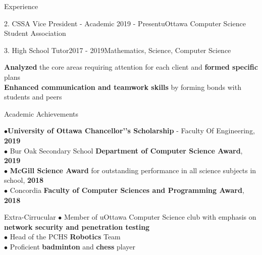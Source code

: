 \documentclass{resume} %
\begin{document}
{\begin{rSection}{Experience}
\begin{rSubsection}{2. CSSA Vice President - Academic }{2019 - Present}{uOttawa Computer Science Student Association}{}
\end{rSubsection}

\begin{rSubsection}{3. High School Tutor}{2017 - 2019}{Mathematics, Science, Computer Science}{}

\begin{list}{\leftmargin=2em}
\item \textbf{Analyzed} the core areas requiring attention for each client and \textbf{formed specific} plans \\
\textbf{Enhanced communication and teamwork skills} by forming bonds with students
and peers 
\end{list}

\end{rSubsection}

\end{rSection}



\begin{rSection}{Academic Achievements} 

\begin{list}{}{\leftmargin=0em} \itemsep -2pt

$\bullet${\bf University of Ottawa Chancellor'’s Scholarship} - Faculty Of Engineering, {\bf 2019} \\
$\bullet$ Bur Oak Secondary School {\bf Department of Computer Science Award}, {\bf 2019}\\
$\bullet$ {\bf McGill Science Award} for outstanding performance in all science subjects in school, {\bf 2018}\\
$\bullet$ Concordia \textbf{Faculty of Computer Sciences and Programming Award}, {\bf 2018}
\vspace{3pt}

\end{list} 

\end{rSection}


\begin{rSection}{Extra-Cirrucular} \itemsep -2pt 
$\bullet$ Member of uOttawa Computer Science club with emphasis on \textbf{network security and penetration testing} \\
$\bullet$ Head of the PCHS \textbf{Robotics} Team \\
$\bullet$ Proficient \textbf{badminton} and \textbf{chess} player 


\end{rSection}}
\end{document}
